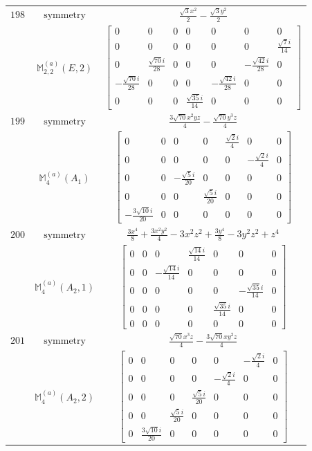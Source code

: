 \documentclass[fleqn,8pt,landscape]{jsarticle}
\begin{document}
\begin{longtable}{ccc}
$ 198 $ & $ \text{symmetry} $ & $ \frac{\sqrt{3} x^{2}}{2} - \frac{\sqrt{3} y^{2}}{2} $ \\
$  $ & $ \mathbb{M}_{2,2}^{(a)}(E,2) $ & $ \begin{bmatrix} 0 & 0 & 0 & 0 & 0 & 0 & 0 \\ 0 & 0 & 0 & 0 & 0 & 0 & \frac{\sqrt{7} i}{14} \\ 0 & \frac{\sqrt{70} i}{28} & 0 & 0 & 0 & - \frac{\sqrt{42} i}{28} & 0 \\ - \frac{\sqrt{70} i}{28} & 0 & 0 & 0 & - \frac{\sqrt{42} i}{28} & 0 & 0 \\ 0 & 0 & 0 & \frac{\sqrt{35} i}{14} & 0 & 0 & 0 \end{bmatrix} $ \\ \hline
$ 199 $ & $ \text{symmetry} $ & $ \frac{3 \sqrt{70} x^{2} y z}{4} - \frac{\sqrt{70} y^{3} z}{4} $ \\
$  $ & $ \mathbb{M}_{4}^{(a)}(A_{1}) $ & $ \begin{bmatrix} 0 & 0 & 0 & 0 & \frac{\sqrt{2} i}{4} & 0 & 0 \\ 0 & 0 & 0 & 0 & 0 & - \frac{\sqrt{2} i}{4} & 0 \\ 0 & 0 & - \frac{\sqrt{5} i}{20} & 0 & 0 & 0 & 0 \\ 0 & 0 & 0 & \frac{\sqrt{5} i}{20} & 0 & 0 & 0 \\ - \frac{3 \sqrt{10} i}{20} & 0 & 0 & 0 & 0 & 0 & 0 \end{bmatrix} $ \\ \hline
$ 200 $ & $ \text{symmetry} $ & $ \frac{3 x^{4}}{8} + \frac{3 x^{2} y^{2}}{4} - 3 x^{2} z^{2} + \frac{3 y^{4}}{8} - 3 y^{2} z^{2} + z^{4} $ \\
$  $ & $ \mathbb{M}_{4}^{(a)}(A_{2},1) $ & $ \begin{bmatrix} 0 & 0 & 0 & \frac{\sqrt{14} i}{14} & 0 & 0 & 0 \\ 0 & 0 & - \frac{\sqrt{14} i}{14} & 0 & 0 & 0 & 0 \\ 0 & 0 & 0 & 0 & 0 & - \frac{\sqrt{35} i}{14} & 0 \\ 0 & 0 & 0 & 0 & \frac{\sqrt{35} i}{14} & 0 & 0 \\ 0 & 0 & 0 & 0 & 0 & 0 & 0 \end{bmatrix} $ \\ \hline
$ 201 $ & $ \text{symmetry} $ & $ \frac{\sqrt{70} x^{3} z}{4} - \frac{3 \sqrt{70} x y^{2} z}{4} $ \\
$  $ & $ \mathbb{M}_{4}^{(a)}(A_{2},2) $ & $ \begin{bmatrix} 0 & 0 & 0 & 0 & 0 & - \frac{\sqrt{2} i}{4} & 0 \\ 0 & 0 & 0 & 0 & - \frac{\sqrt{2} i}{4} & 0 & 0 \\ 0 & 0 & 0 & \frac{\sqrt{5} i}{20} & 0 & 0 & 0 \\ 0 & 0 & \frac{\sqrt{5} i}{20} & 0 & 0 & 0 & 0 \\ 0 & \frac{3 \sqrt{10} i}{20} & 0 & 0 & 0 & 0 & 0 \end{bmatrix} $ \\ \hline

\end{longtable}
\end{document}
